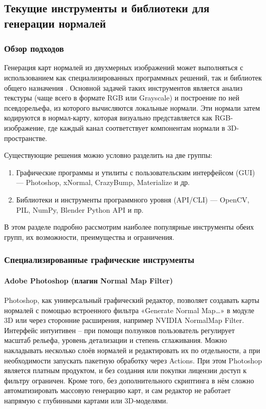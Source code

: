 \subsection{Текущие инструменты и библиотеки для генерации нормалей}
\subsubsection{Обзор подходов}

Генерация карт нормалей из двухмерных изображений может выполняться с использованием как специализированных программных решений, так и библиотек общего назначения \cite{tyagi2021}. Основной задачей таких инструментов является анализ текстуры (чаще всего в формате RGB или Grayscale) и построение по ней псевдорельефа, из которого вычисляются локальные нормали. Эти нормали затем кодируются в нормал-карту, которая визуально представляется как RGB-изображение, где каждый канал соответствует компонентам нормали в 3D-пространстве.

Существующие решения можно условно разделить на две группы:
\begin{enumerate}
	\item Графические программы и утилиты с пользовательским интерфейсом (GUI) — Photoshop, xNormal, CrazyBump, Materialize и др.
	\item Библиотеки и инструменты программного уровня (API/CLI) — OpenCV, PIL, NumPy, Blender Python API и пр.
\end{enumerate}

В этом разделе подробно рассмотрим наиболее популярные инструменты обеих групп, их возможности, преимущества и ограничения.
\subsubsection{Специализированные графические инструменты}
\paragraph{Adobe Photoshop (плагин Normal Map Filter)}

Photoshop, как универсальный графический редактор, позволяет создавать карты нормалей с помощью встроенного фильтра «Generate Normal Map…» в модуле 3D или через сторонние расширения, например NVIDIA NormalMap Filter. Интерфейс интуитивен -- при помощи ползунков пользователь регулирует масштаб рельефа, уровень детализации и степень сглаживания. Можно накладывать несколько слоёв нормалей и редактировать их по отдельности, а при необходимости запускать пакетную обработку через Actions. При этом Photoshop является платным продуктом, и без создания или покупки лицензии доступ к фильтру ограничен. Кроме того, без дополнительного скриптинга в нём сложно автоматизировать массовую генерацию карт, и сам редактор не работает напрямую с глубинными картами или 3D‑моделями.
